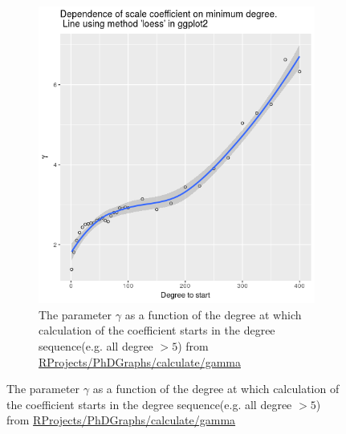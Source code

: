 


\begin{figure}
    \centering
    \begin{subfigure}[t]{0.45\textwidth}
        \centering
        \includegraphics[width=\linewidth]{images/dependence_of_scale_coefficient_on_min_degree.png} 
        \caption{The parameter $\gamma$ as a function of the degree at which calculation of the coefficient starts in the degree sequence(e.g. all degree $>5$) from \url{RProjects/PhDGraphs/calculate/gamma}} \label{fig:gamma}

\end{subfigure}
\end{figure}
